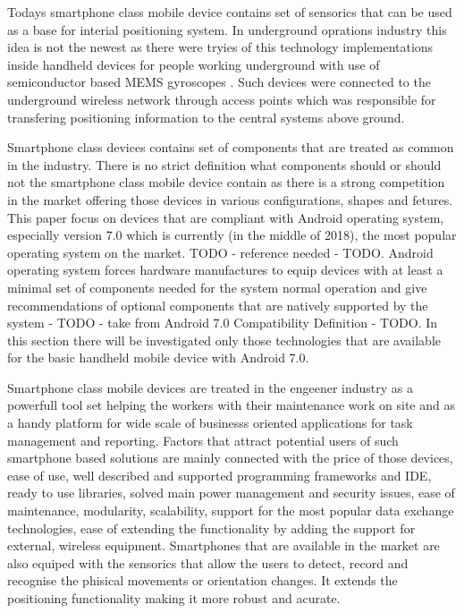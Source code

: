 \documentclass[../main.tex]{subfiles}
\begin{document}
Todays smartphone class mobile device contains set of sensorics that can be used as a base for interial positioning system. In underground oprations industry this idea is not the newest as there were tryies of this technology implementations inside handheld devices for people working underground with use of semiconductor based MEMS gyroscopes \cite{Thesis_CM}. Such devices were connected to the underground wireless network through access points which was responsible for transfering positioning information to the central systems above ground.

Smartphone class devices contains set of components that are treated as common in the industry. There is no strict definition what components should or should not the smartphone class mobile device contain as there is a strong competition in the market offering those devices in various configurations, shapes and fetures. This paper focus on devices that are compliant with Android operating system, especially version 7.0 which is currently (in the middle of 2018), the most popular operating system on the market. TODO - reference needed - TODO. Android operating system forces hardware manufactures to equip devices with at least a minimal set of components needed for the system normal operation and give recommendations of optional components that are natively supported by the system  - TODO - take from Android 7.0 Compatibility Definition - TODO. In this section there will be investigated only those technologies that are available for the basic handheld mobile device with Android 7.0.

Smartphone class mobile devices are treated in the engeener industry as a powerfull tool set helping the workers with their maintenance work on site and as a handy platform for wide scale of businesss oriented applications for task management and reporting. Factors that attract potential users of such smartphone based solutions are mainly connected with the price of those devices, ease of use, well described and supported programming frameworks and IDE, ready to use libraries, solved main power management and security issues, ease of maintenance, modularity, scalability, support for the most popular data exchange technologies, ease of extending the functionality by adding the support for external, wireless equipment. Smartphones that are available in the market are also equiped with the sensorics that allow the users to detect, record and recognise the phisical movements or orientation changes. It extends the positioning functionality making it more robust and acurate.
\end{document}
